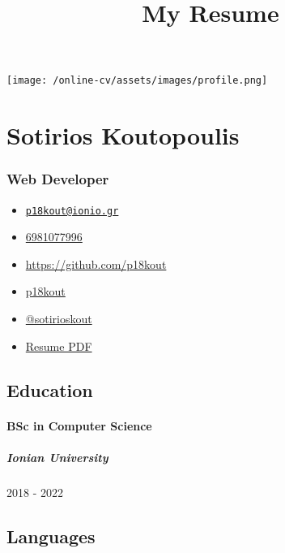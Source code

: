 \documentclass[
]{article}
\title{My Resume}
\author{}
\date{}
\providecommand{\tightlist}{%
  \setlength{\itemsep}{0pt}\setlength{\parskip}{0pt}}
\begin{document}
\maketitle

\texttt{[image: /online-cv/assets/images/profile.png]}

\hypertarget{sotirios-koutopoulis}{%
\section{Sotirios Koutopoulis}\label{sotirios-koutopoulis}}

\hypertarget{web-developer}{%
\subsubsection{Web Developer}\label{web-developer}}

\begin{itemize}
\tightlist
\item
  \emph{} \href{mailto:p18kout@ionio.gr}{\nolinkurl{p18kout@ionio.gr}}
\item
  \emph{} \href{tel:6981077996}{6981077996}
\item
  \emph{}
  \href{http://https://github.com/p18kout}{https://github.com/p18kout}
\item
  \emph{} \href{http://github.com/p18kout}{p18kout}
\item
  \emph{} \href{https://twitter.com/@sotirioskout}{@sotirioskout}
\item
  \emph{} \href{http://www.africau.edu/images/default/sample.pdf}{Resume
  PDF}
\end{itemize}

\hypertarget{education}{%
\subsection{Education}\label{education}}

\hypertarget{bsc-in-computer-science}{%
\paragraph{BSc in Computer Science}\label{bsc-in-computer-science}}

\hypertarget{ionian-university}{%
\subparagraph{Ionian University}\label{ionian-university}}

2018 - 2022

\hypertarget{languages}{%
\subsection{Languages}\label{languages}}
\end{document}
